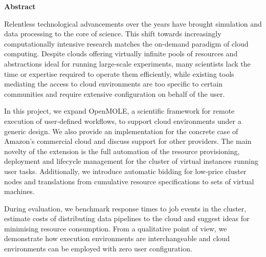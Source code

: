 \thispagestyle{empty}

\begin{center}
\vspace*{4cm}
\textbf{Abstract}
\end{center}

\vspace*{0.3cm}
\begin{spacing}{1.0}
Relentless technological advancements over the years have brought simulation and data processing to the core of science. This shift towards increasingly computationally intensive research matches the on-demand paradigm of cloud computing. Despite clouds offering virtually infinite pools of resources and abstractions ideal for running large-scale experiments, many scientists lack the time or expertise required to operate them efficiently, while existing tools mediating the access to cloud environments are too specific to certain communities and require extensive configuration on behalf of the user. 

In this project, we expand OpenMOLE, a scientific framework for remote execution of user-defined workflows, to support cloud environments under a generic design. We also provide an implementation for the concrete case of Amazon's commercial cloud and discuss support for other providers. The main novelty of the extension is the full automation of the resource provisioning, deployment and lifecycle management for the cluster of virtual instances running user tasks. Additionally, we introduce automatic bidding for low-price cluster nodes and translations from cumulative resource specifications to sets of virtual machines.

During evaluation, we benchmark response times to job events in the cluster, estimate costs of distributing data pipelines to the cloud and suggest ideas for minimising resource consumption. From a qualitative point of view, we demonstrate how execution environments are interchangeable and cloud environments can be employed with zero user configuration.
\end{spacing}

\newpage
\blankpage










